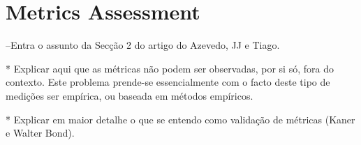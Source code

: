 \section{Metrics Assessment}
--Entra o assunto da Secção 2 do artigo do Azevedo, JJ e Tiago.

    * Explicar aqui que as métricas não podem ser observadas, por si só, fora do contexto. Este problema prende-se essencialmente com o facto deste tipo de medições ser empírica, ou baseada em métodos empíricos.

    * Explicar em maior detalhe o que se entendo como validação de métricas (Kaner e Walter Bond).